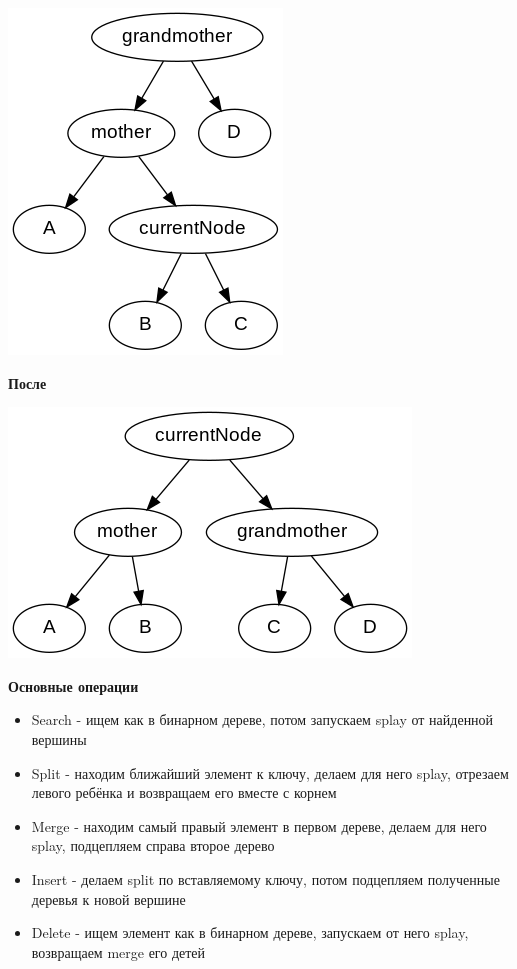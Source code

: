 \documentclass[a4paper,10pt]{article}
\begin{document}
\begin{itemize}
	\begin{center}\includegraphics[scale=0.7]{splayZigZagBefore.png}\end{center} 
	\textbf{После} \\
	\begin{center}\includegraphics[scale=0.7]{splayZigZagAfter.png}\end{center} 
\end{itemize} 

\textbf{Основные операции} \\
\begin{itemize}
	\item Search - ищем как в бинарном дереве, потом запускаем splay от найденной вершины
	\item Split - находим ближайший элемент к ключу, делаем для него splay, отрезаем левого ребёнка и возвращаем его вместе с корнем
	\item Merge - находим самый правый элемент в первом дереве, делаем для него splay, подцепляем справа второе дерево
	\item Insert - делаем split по вставляемому ключу, потом подцепляем полученные деревья к новой вершине
	\item Delete - ищем элемент как в бинарном дереве, запускаем от него splay, возвращаем merge его детей
\end{itemize}
\end{document}

